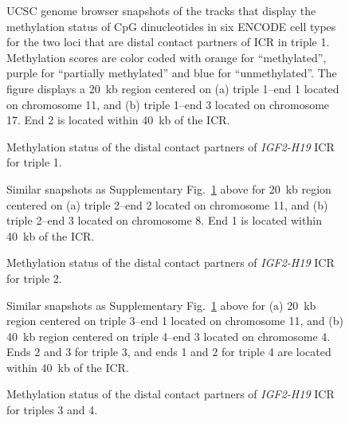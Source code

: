 \begin{figure}
\begin{center}
  \hspace{0.01\textwidth}
\end{center}
\caption{Methylation status of the distal contact partners of \emph{IGF2-H19} ICR for triple 1.}
{UCSC genome browser snapshots of the tracks that display the methylation
    status of CpG dinucleotides in six ENCODE cell types for the two loci
    that are distal contact partners of ICR in triple 1. Methylation scores
    are color coded with orange for ``methylated'', purple for ``partially methylated''
    and blue for ``unmethylated''. The figure displays a 20~kb region centered on
    (a) triple 1--end 1 located on chromosome 11, and
    (b) triple 1--end 3 located on chromosome 17.
    End 2 is located within 40~kb of the ICR.
}
\label{suppfig:triple1methyl}
\end{figure}
\clearpage

\begin{figure}
\begin{center}
  \hspace{0.01\textwidth}
\end{center}
\caption{Methylation status of the distal contact partners of \emph{IGF2-H19} ICR for triple 2.}
{Similar snapshots as Supplementary Fig.~\ref{suppfig:triple1methyl} above for 20~kb
    region centered on (a) triple 2--end 2 located on chromosome 11, and
    (b) triple 2--end 3 located on chromosome 8.
    End 1 is located within 40~kb of the ICR.
}
\label{suppfig:triple2methyl}
\end{figure}
\clearpage

\begin{figure}
\begin{center}
  \hspace{0.01\textwidth}
\end{center}
\caption{Methylation status of the distal contact partners of \emph{IGF2-H19} ICR for triples 3 and 4.}
{Similar snapshots as Supplementary Fig.~\ref{suppfig:triple1methyl} above for (a) 20~kb
    region centered on triple 3--end 1 located on chromosome 11, and
    (b) 40~kb region centered on triple 4--end 3 located on chromosome 4.
    Ends 2 and 3 for triple 3, and ends 1 and 2 for triple 4 are located within 40~kb of the ICR.
}
\label{suppfig:triple3methyl}
\end{figure}
\clearpage

